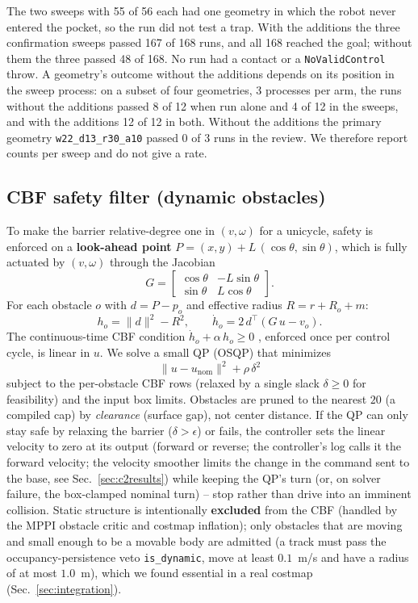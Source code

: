 \documentclass[journal]{IEEEtran}
\begin{document}
The two sweeps with 55 of 56 each had one geometry in which the robot never entered the
pocket, so the run did not test a trap. With the additions the three confirmation sweeps
passed 167 of 168 runs, and all 168 reached the goal; without them the three passed 48
of 168. No run had a contact or a \texttt{NoValidControl} throw. A geometry's outcome
without the additions depends on its position in the sweep process: on a subset of four
geometries, 3 processes per arm, the runs without the additions passed 8 of 12 when run
alone and 4 of 12 in the sweeps, and with the additions 12 of 12 in both. Without the
additions the primary geometry \texttt{w22\_d13\_r30\_a10} passed 0 of 3 runs in the
review. We therefore report counts per sweep and do not give a rate.

\subsection{CBF safety filter (dynamic obstacles)}
\label{sec:cbf}
To make the barrier relative-degree one in $(v,\omega)$ for a unicycle,
safety is enforced on a \textbf{look-ahead point}
$P = (x,y) + L\,(\cos\theta,\sin\theta)$, which is fully actuated by
$(v,\omega)$ through the Jacobian
\begin{equation}
G=\begin{bmatrix}\cos\theta & -L\sin\theta\\ \sin\theta & L\cos\theta\end{bmatrix}.
\end{equation}
For each obstacle $o$ with $d=P-p_o$ and effective radius
$R = r + R_o + m$:
\begin{equation}
h_o = \lVert d\rVert^2 - R^2, \qquad \dot h_o = 2\,d^\top (G\,u - v_o).
\end{equation}
The continuous-time CBF condition $\dot h_o + \alpha\,h_o \ge 0$
\cite{ames_cbf_tac,ames_cbf_ecc}, enforced once per control cycle, is
linear in $u$. We solve a small QP (OSQP) \cite{osqp} that minimizes
\begin{equation}
\lVert u - u_\text{nom}\rVert^2 + \rho\,\delta^2
\end{equation}
subject to the per-obstacle CBF rows (relaxed by a single slack
$\delta\ge0$ for feasibility) and the input box limits. Obstacles are
pruned to the nearest $20$ (a compiled cap) by \emph{clearance} (surface gap), not center
distance. If the QP can only stay safe by relaxing the barrier
($\delta>\epsilon$) or fails, the controller sets the linear velocity to zero at its output
(forward or reverse; the controller's log calls it the forward velocity; the velocity smoother limits
the change in the command sent to the base, see Sec.~\ref{sec:c2results}) while keeping the QP's turn (or, on solver failure, the
box-clamped nominal turn) -- stop rather than drive
into an imminent collision. Static structure is intentionally
\textbf{excluded} from the CBF (handled by the MPPI obstacle critic and
costmap inflation); only obstacles that are moving and small enough to be
a movable body are admitted (a track must pass the occupancy-persistence veto
\texttt{is\_dynamic}, move at least $0.1$~m/s and have a radius of at most $1.0$~m),
which we found essential in a real costmap
(Sec.~\ref{sec:integration}).
\end{document}
